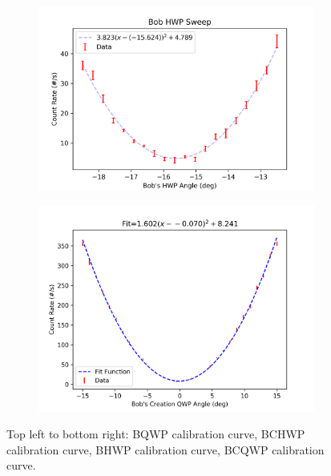 \documentclass{paper}[11pt]
\begin{document}
\begin{figure}
\begin{subfigure}{0.35\linewidth}
        \caption{}
        \label{fig:BCHWP}
    \end{subfigure}
    \begin{subfigure}{0.35\linewidth}
        \centering
        \includegraphics[width=1\linewidth]{figs/BHWP_sweep2.png}
        \caption{}
        \label{fig:BHWP}
    \end{subfigure}
    \begin{subfigure}{0.27\linewidth}
        \centering
        \includegraphics[width=1\linewidth]{figs/BCQWP2.png}
        \caption{}
        \label{fig:BCQWP}
    \end{subfigure}
    \caption{Top left to bottom right: BQWP calibration curve, BCHWP calibration curve, BHWP calibration curve, BCQWP calibration curve.}
\end{figure}
\end{document}

